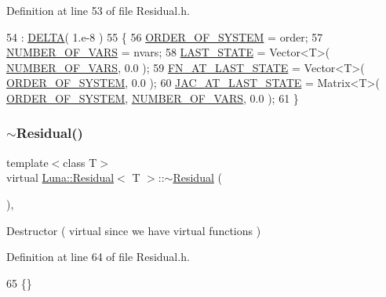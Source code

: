 Definition at line 53 of file Residual.\+h.


\begin{DoxyCode}
54                                         : \hyperlink{classLuna_1_1Residual_a1bf38ddfa149797de560dcb11c975fef}{DELTA}( 1.e-8 )
55       \{
56         \hyperlink{classLuna_1_1Residual_a7facf1267eb277d84aeea8beba2cb200}{ORDER\_OF\_SYSTEM} = order;
57         \hyperlink{classLuna_1_1Residual_a8e7a52a94a49d900ba2784e621a35668}{NUMBER\_OF\_VARS} = nvars;
58         \hyperlink{classLuna_1_1Residual_abcfc99f00aa4cf3616b32dfd5315dece}{LAST\_STATE} = Vector<T>( \hyperlink{classLuna_1_1Residual_a8e7a52a94a49d900ba2784e621a35668}{NUMBER\_OF\_VARS}, 0.0 );
59         \hyperlink{classLuna_1_1Residual_ac7b086911239d3f42ceec4a826e83543}{FN\_AT\_LAST\_STATE} = Vector<T>( \hyperlink{classLuna_1_1Residual_a7facf1267eb277d84aeea8beba2cb200}{ORDER\_OF\_SYSTEM}, 0.0 );
60         \hyperlink{classLuna_1_1Residual_ac76c460240288f84309b587c785df06a}{JAC\_AT\_LAST\_STATE} = Matrix<T>( \hyperlink{classLuna_1_1Residual_a7facf1267eb277d84aeea8beba2cb200}{ORDER\_OF\_SYSTEM}, 
      \hyperlink{classLuna_1_1Residual_a8e7a52a94a49d900ba2784e621a35668}{NUMBER\_OF\_VARS}, 0.0 );
61       \}
\end{DoxyCode}
\mbox{\label{classLuna_1_1Residual_a49919ce545464441f326d3be815241af}} 
\subsubsection{\texorpdfstring{$\sim$\+Residual()}{~Residual()}}
{\footnotesize\ttfamily template$<$class T$>$ \\
virtual \hyperlink{classLuna_1_1Residual}{Luna\+::\+Residual}$<$ T $>$\+::$\sim$\hyperlink{classLuna_1_1Residual}{Residual} (\begin{DoxyParamCaption}{ }\end{DoxyParamCaption})\hspace{0.3cm}{\ttfamily [inline]}, {\ttfamily [virtual]}}



Destructor ( virtual since we have virtual functions ) 



Definition at line 64 of file Residual.\+h.


\begin{DoxyCode}
65       \{\}
\end{DoxyCode}


